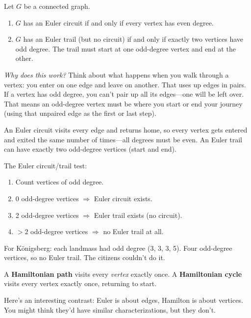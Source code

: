 \begin{theorem}
Let $G$ be a connected graph.
\begin{enumerate}
  \item $G$ has an Euler circuit if and only if every vertex has even degree.
  \item $G$ has an Euler trail (but no circuit) if and only if exactly two vertices have odd degree. The trail must start at one odd-degree vertex and end at the other.
\end{enumerate}
\end{theorem}

\emph{Why does this work?} Think about what happens when you walk through a vertex: you enter on one edge and leave on another. That uses up edges in pairs. If a vertex has odd degree, you can't pair up all its edges---one will be left over. That means an odd-degree vertex must be where you start or end your journey (using that unpaired edge as the first or last step).

An Euler circuit visits every edge and returns home, so every vertex gets entered and exited the same number of times---all degrees must be even. An Euler trail can have exactly two odd-degree vertices (start and end).

\begin{keyresult}
The Euler circuit/trail test:
\begin{enumerate}
  \item Count vertices of odd degree.
  \item 0 odd-degree vertices $\Rightarrow$ Euler circuit exists.
  \item 2 odd-degree vertices $\Rightarrow$ Euler trail exists (no circuit).
  \item $>2$ odd-degree vertices $\Rightarrow$ no Euler trail at all.
\end{enumerate}
\end{keyresult}

For Königsberg: each landmass had odd degree (3, 3, 3, 5). Four odd-degree vertices, so no Euler trail. The citizens couldn't do it.

\begin{definition}
A \textbf{Hamiltonian path} visits every \emph{vertex} exactly once.
A \textbf{Hamiltonian cycle} visits every vertex exactly once, returning to start.
\end{definition}

Here's an interesting contrast: Euler is about edges, Hamilton is about vertices. You might think they'd have similar characterizations, but they don't.

